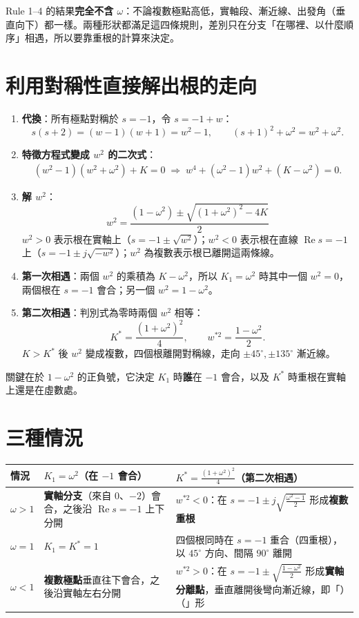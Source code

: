 \documentclass[11pt,a4paper]{article}
\begin{document}
Rule 1--4 的結果\textbf{完全不含 $\omega$}：不論複數極點高低，實軸段、漸近線、出發角（垂直向下）都一樣。兩種形狀都滿足這四條規則，差別只在分支「在哪裡、以什麼順序」相遇，所以要靠重根的計算來決定。

\section{利用對稱性直接解出根的走向}
\begin{derivationbox}[完整推導：以 $w=s+1$ 代換]
\begin{enumerate}[leftmargin=2.2em]
  \item \textbf{代換}：所有極點對稱於 $s=-1$，令 $s=-1+w$：
  \[
  s(s+2)=(w-1)(w+1)=w^2-1,\qquad (s+1)^2+\omega^2=w^2+\omega^2 .
  \]
  \item \textbf{特徵方程式變成 $w^2$ 的二次式}：
  \begin{align*}
  (w^2-1)(w^2+\omega^2)+K=0
  \;\Rightarrow\;
  w^4+(\omega^2-1)w^2+(K-\omega^2)=0 .
  \end{align*}
  \item \textbf{解 $w^2$}：
  \[
  \boxed{\,w^2=\frac{(1-\omega^2)\pm\sqrt{(1+\omega^2)^2-4K}}{2}\,}
  \]
  $w^2>0$ 表示根在實軸上（$s=-1\pm\sqrt{w^2}$）；$w^2<0$ 表示根在直線 $\operatorname{Re}s=-1$ 上（$s=-1\pm j\sqrt{-w^2}$）；$w^2$ 為複數表示根已離開這兩條線。
  \item \textbf{第一次相遇}：兩個 $w^2$ 的乘積為 $K-\omega^2$，所以 $K_1=\omega^2$ 時其中一個 $w^2=0$，兩個根在 $s=-1$ 會合；另一個 $w^2=1-\omega^2$。
  \item \textbf{第二次相遇}：判別式為零時兩個 $w^2$ 相等：
  \[
  K^*=\frac{(1+\omega^2)^2}{4},\qquad w^{*2}=\frac{1-\omega^2}{2}.
  \]
  $K>K^*$ 後 $w^2$ 變成複數，四個根離開對稱線，走向 $\pm45^\circ,\pm135^\circ$ 漸近線。
\end{enumerate}
\end{derivationbox}

關鍵在於 $1-\omega^2$ 的正負號，它決定 $K_1$ 時\textbf{誰}在 $-1$ 會合，以及 $K^*$ 時重根在實軸上還是在虛數處。

\section{三種情況}

\begin{tabularx}{\linewidth}{>{\raggedright}p{2.2cm}>{\raggedright}p{4.6cm}X}
\toprule
情況 & $K_1=\omega^2$（在 $-1$ 會合） & $K^*=\frac{(1+\omega^2)^2}{4}$（第二次相遇）\tabularnewline\midrule
$\omega>1$ & \textbf{實軸分支}（來自 $0$、$-2$）會合，之後沿 $\operatorname{Re}s=-1$ 上下分開 & $w^{*2}<0$：在 $s=-1\pm j\sqrt{\frac{\omega^2-1}{2}}$ 形成\textbf{複數重根}\tabularnewline
$\omega=1$ & $K_1=K^*=1$ & 四個根同時在 $s=-1$ 重合（四重根），以 $45^\circ$ 方向、間隔 $90^\circ$ 離開\tabularnewline
$\omega<1$ & \textbf{複數極點}垂直往下會合，之後沿實軸左右分開 & $w^{*2}>0$：在 $s=-1\pm\sqrt{\frac{1-\omega^2}{2}}$ 形成\textbf{實軸分離點}，垂直離開後彎向漸近線，即「）（」形\tabularnewline
\bottomrule
\end{tabularx}
\end{document}
